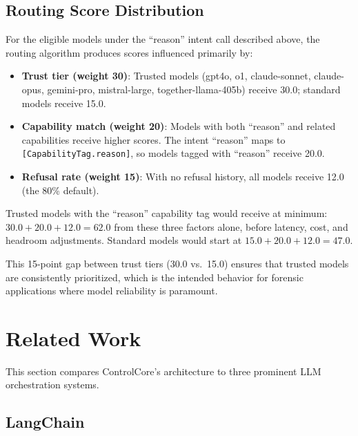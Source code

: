 \documentclass[11pt,a4paper]{article}
\theoremstyle{plain}
\theoremstyle{definition}
\begin{document}
\subsection{Routing Score Distribution}

For the eligible models under the ``reason'' intent call described above,
the routing algorithm produces scores influenced primarily by:
\begin{itemize}[leftmargin=2em]
\item \textbf{Trust tier (weight 30)}: Trusted models (gpt4o, o1,
  claude-sonnet, claude-opus, gemini-pro, mistral-large, together-llama-405b)
  receive 30.0; standard models receive 15.0.
\item \textbf{Capability match (weight 20)}: Models with both ``reason'' and
  related capabilities receive higher scores. The intent ``reason'' maps to
  \texttt{[CapabilityTag.reason]}, so models tagged with ``reason'' receive 20.0.
\item \textbf{Refusal rate (weight 15)}: With no refusal history, all models
  receive 12.0 (the 80\% default).
\end{itemize}

Trusted models with the ``reason'' capability tag would receive at minimum:
$30.0 + 20.0 + 12.0 = 62.0$ from these three factors alone, before latency,
cost, and headroom adjustments. Standard models would start at $15.0 + 20.0 +
12.0 = 47.0$.

This 15-point gap between trust tiers (30.0 vs.\ 15.0) ensures that trusted
models are consistently prioritized, which is the intended behavior for forensic
applications where model reliability is paramount.

\section{Related Work}
\label{sec:related}

This section compares ControlCore's architecture to three prominent LLM
orchestration systems.

\subsection{LangChain}
\end{document}
